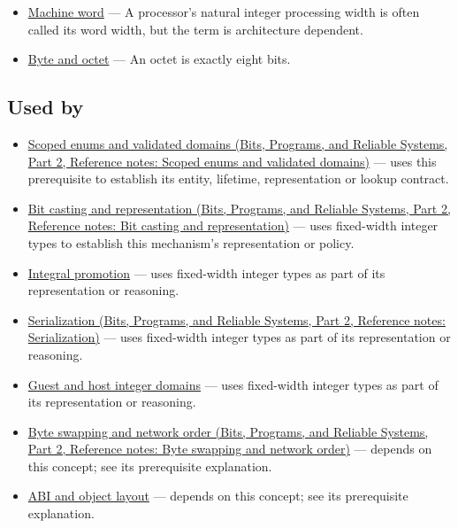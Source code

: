 \hypertarget{appendix-cc04044b5782-prerequisites}{}

\begin{itemize}
\tightlist
\item
  \hyperref[appendix-d67a19507dc5]{Machine word} --- A processor's natural integer processing width is often called its word width, but the term is architecture dependent.
\item
  \hyperref[appendix-5bee2df85484]{Byte and octet} --- An octet is exactly eight bits.
\end{itemize}

\subsection{Used by}\label{appendix-cc04044b5782-used-by}

\hypertarget{appendix-cc04044b5782-used-by}{}

\begin{itemize}
\tightlist
\item
  \href{../01-Bits-Programs-and-Reliable-Systems-P02/main.pdf\#nameddest=appendix-23640fcee147}{Scoped enums and validated domains (Bits, Programs, and Reliable Systems, Part 2, Reference notes: Scoped enums and validated domains)} --- uses this prerequisite to establish its entity, lifetime, representation or lookup contract.
\item
  \href{../01-Bits-Programs-and-Reliable-Systems-P02/main.pdf\#nameddest=appendix-34ee45f161c1}{Bit casting and representation (Bits, Programs, and Reliable Systems, Part 2, Reference notes: Bit casting and representation)} --- uses fixed-width integer types to establish this mechanism's representation or policy.
\item
  \hyperref[appendix-45303d03796a]{Integral promotion} --- uses fixed-width integer types as part of its representation or reasoning.
\item
  \href{../01-Bits-Programs-and-Reliable-Systems-P02/main.pdf\#nameddest=appendix-91d09ebed979}{Serialization (Bits, Programs, and Reliable Systems, Part 2, Reference notes: Serialization)} --- uses fixed-width integer types as part of its representation or reasoning.
\item
  \hyperref[appendix-33e7a011b684]{Guest and host integer domains} --- uses fixed-width integer types as part of its representation or reasoning.
\item
  \href{../01-Bits-Programs-and-Reliable-Systems-P02/main.pdf\#nameddest=appendix-11ba36693aa2}{Byte swapping and network order (Bits, Programs, and Reliable Systems, Part 2, Reference notes: Byte swapping and network order)} --- depends on this concept; see its prerequisite explanation.
\item
  \hyperref[appendix-c4ac6bb0fff8]{ABI and object layout} --- depends on this concept; see its prerequisite explanation.
\end{itemize}

